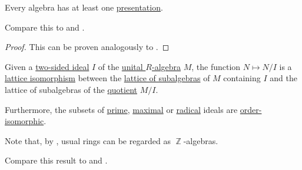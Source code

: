 \begin{proposition}\label{thm:algebra_presentation_existence}
  Every algebra has at least one \hyperref[def:algebra_presentation]{presentation}.

  Compare this to  and .
\end{proposition}
\begin{proof}
  This can be proven analogously to .
\end{proof}

\begin{theorem}\label{thm:quotient_ideal_lattice_theorem}
  Given a \hyperref[def:semiring_ideal]{two-sided ideal} \( I \) of the \hyperref[def:algebra_over_ring]{unital \( R \)-algebra} \( M \), the function \( N \mapsto N / I \) is a \hyperref[def:semilattice/homomorphism]{lattice isomorphism} between the \hyperref[thm:substructures_form_complete_lattice]{lattice of subalgebras} of \( M \) containing \( I \) and the lattice of subalgebras of the \hyperref[def:ring/quotient]{quotient} \( M / I \).

  Furthermore, the subsets of \hyperref[def:semiring_ideal/prime]{prime}, \hyperref[def:semiring_ideal/maximal]{maximal} or \hyperref[def:radical_ideal]{radical} ideals are \hyperref[def:partially_ordered_set/homomorphism]{order-isomorphic}.

  Note that, by , usual rings can be regarded as \( \BbbZ \)-algebras.

  Compare this result to  and .
\end{theorem}
